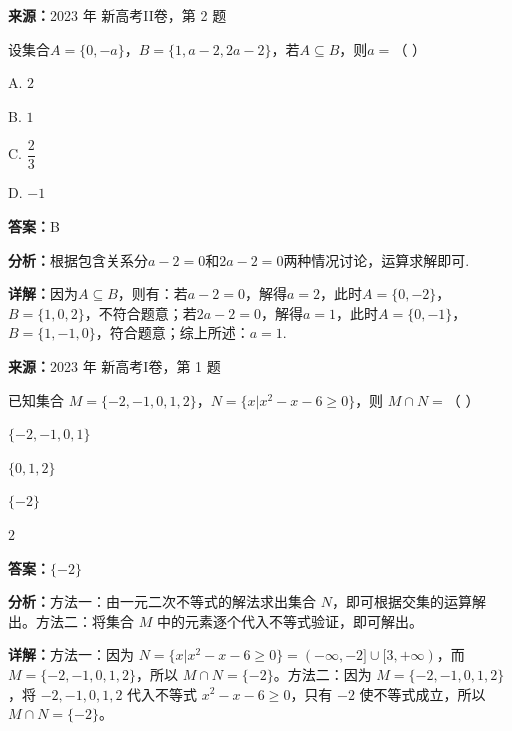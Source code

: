 \begin{question}[points=5]
\textbf{来源：}2023 年 新高考II卷，第 2 题\par
设集合$A=\{0,-a\}$，$B=\{1,a-2,2a-2\}$，若$A\subseteq B$，则$a=$（ \quad ）
\begin{choices}
  \item A. $2$
  \item B. $1$
  \item C. $\dfrac{2}{3}$
  \item D. $-1$
\end{choices}
\begin{solution}
\textbf{答案：}B

\textbf{分析：}根据包含关系分$a-2=0$和$2a-2=0$两种情况讨论，运算求解即可.

\textbf{详解：}因为$A\subseteq B$，则有：若$a-2=0$，解得$a=2$，此时$A=\{0,-2\}$，$B=\{1,0,2\}$，不符合题意；若$2a-2=0$，解得$a=1$，此时$A=\{0,-1\}$，$B=\{1,-1,0\}$，符合题意；综上所述：$a=1$.
\end{solution}
\end{question}

\begin{question}[points=5]
\textbf{来源：}2023 年 新高考I卷，第 1 题\par
已知集合 $M=\{-2,-1,0,1,2\}$，$N=\{x|x^2-x-6\geq 0\}$，则 $M\cap N=$（ ）
\begin{choices}
  \item $\{-2,-1,0,1\}$
  \item $\{0,1,2\}$
  \item $\{-2\}$
  \item $2$
\end{choices}
\begin{solution}
\textbf{答案：}$\{-2\}$

\textbf{分析：}方法一：由一元二次不等式的解法求出集合 $N$，即可根据交集的运算解出。方法二：将集合 $M$ 中的元素逐个代入不等式验证，即可解出。

\textbf{详解：}方法一：因为 $N=\{x|x^2-x-6\geq 0\}=(-\infty,-2]\cup[3,+\infty)$，而 $M=\{-2,-1,0,1,2\}$，所以 $M\cap N=\{-2\}$。方法二：因为 $M=\{-2,-1,0,1,2\}$，将 $-2,-1,0,1,2$ 代入不等式 $x^2-x-6\geq 0$，只有 $-2$ 使不等式成立，所以 $M\cap N=\{-2\}$。
\end{solution}
\end{question}


